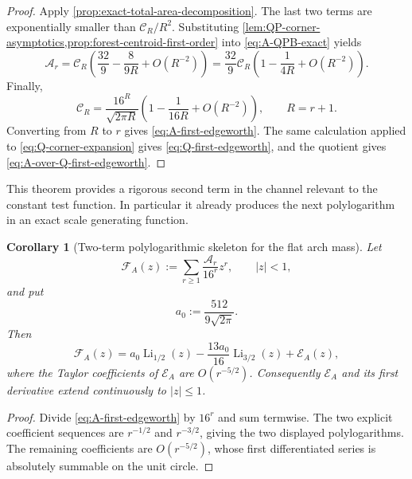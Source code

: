 \documentclass[11pt]{article}
\newtheorem{corollary}[theorem]{Corollary}
\theoremstyle{definition}
\theoremstyle{remark}
\begin{document}
\begin{proof}
Apply \cref{prop:exact-total-area-decomposition}.
The last two terms are exponentially smaller than
\(\mathscr C_R/R^2\).  Substituting
\cref{lem:QP-corner-asymptotics,prop:forest-centroid-first-order} into
\eqref{eq:A-QPB-exact} yields
\begin{equation}
 \mathcal A_r
 =\mathscr C_R
 \left(
 \frac{32}{9}-\frac{8}{9R}+O(R^{-2})
 \right)
 =\frac{32}{9}\mathscr C_R
 \left(1-\frac{1}{4R}+O(R^{-2})\right).
 \label{eq:A-central-binomial-form}
\end{equation}
Finally,
\[
 \mathscr C_R
 =\frac{16^R}{\sqrt{2\pi R}}
 \left(1-\frac{1}{16R}+O(R^{-2})\right),
 \qquad R=r+1.
\]
Converting from \(R\) to \(r\) gives
\eqref{eq:A-first-edgeworth}.  The same calculation applied to
\eqref{eq:Q-corner-expansion} gives \eqref{eq:Q-first-edgeworth}, and the
quotient gives \eqref{eq:A-over-Q-first-edgeworth}.
\end{proof}

This theorem provides a rigorous second term in the channel relevant to the
constant test function.  In particular it already produces the next
polylogarithm in an exact scale generating function.

\begin{corollary}[Two-term polylogarithmic skeleton for the flat arch mass]
\label{cor:flat-area-polylog}
Let
\begin{equation}
 \mathscr F_{\!A}(z)
 :=\sum_{r\ge1}\frac{\mathcal A_r}{16^r}z^r,
 \qquad |z|<1,
 \label{eq:flat-area-generating}
\end{equation}
and put
\[
 a_0:=\frac{512}{9\sqrt{2\pi}}.
\]
Then
\begin{equation}
 {
 \mathscr F_{\!A}(z)
 =a_0\operatorname{Li}_{1/2}(z)
 -\frac{13a_0}{16}\operatorname{Li}_{3/2}(z)
 +\mathscr E_A(z),}
 \label{eq:flat-area-two-polylogs}
\end{equation}
where the Taylor coefficients of \(\mathscr E_A\) are
\(O(r^{-5/2})\).  Consequently \(\mathscr E_A\) and its first derivative
extend continuously to \(|z|\le1\).
\end{corollary}

\begin{proof}
Divide \eqref{eq:A-first-edgeworth} by \(16^r\) and sum termwise.  The two
explicit coefficient sequences are \(r^{-1/2}\) and \(r^{-3/2}\), giving
the two displayed polylogarithms.  The remaining coefficients are
\(O(r^{-5/2})\), whose first differentiated series is absolutely summable
on the unit circle.
\end{proof}
\end{document}
